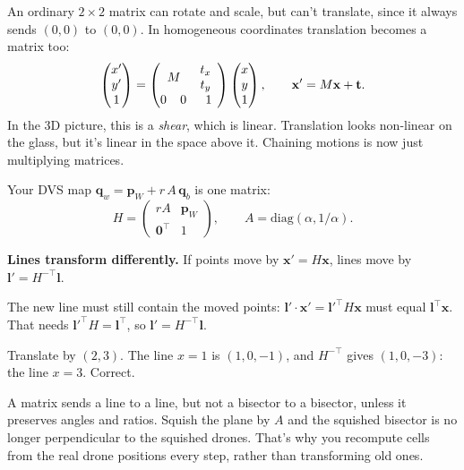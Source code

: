 \documentclass[11pt,a4paper]{article}
\newcommand{\vect}[1]{\mathbf{#1}}
\newcommand{\T}{^{\top}}
\newcommand{\vl}{\vect{l}}
\begin{document}
An ordinary $2\times2$ matrix can rotate and scale, but can't translate, since it always sends $(0,0)$ to $(0,0)$. In
homogeneous coordinates translation becomes a matrix too:
\[
\begin{pmatrix}x'\\y'\\1\end{pmatrix}=
\begin{pmatrix}\multicolumn{2}{c}{\;\;M\;\;}&\begin{matrix}t_x\\t_y\end{matrix}\\[2pt]0&0&1\end{pmatrix}
\begin{pmatrix}x\\y\\1\end{pmatrix},
\qquad \vect{x}'=M\vect{x}+\vect{t}.
\]
In the 3D picture, this is a \emph{shear}, which is linear. Translation looks non-linear on the glass, but it's linear
in the space above it. Chaining motions is now just multiplying matrices.

\begin{oursbox}
Your DVS map $\vect{q}_w=\vect{p}_W+r\,A\,\vect{q}_b$ is one matrix:
\[
H=\begin{pmatrix}rA&\vect{p}_W\\ \vect{0}\T&1\end{pmatrix},\qquad A=\mathrm{diag}(\alpha,1/\alpha).
\]
\end{oursbox}

\textbf{Lines transform differently.} If points move by $\vect{x}'=H\vect{x}$, lines move by $\vl'=H^{-\top}\vl$.
\begin{whybox}
The new line must still contain the moved points: $\vl'\cdot\vect{x}'=\vl'^{\top}H\vect{x}$ must equal $\vl\T\vect{x}$. That needs
$\vl'^{\top}H=\vl\T$, so $\vl'=H^{-\top}\vl$.
\end{whybox}
\begin{examplebox}
Translate by $(2,3)$. The line $x=1$ is $(1,0,-1)$, and $H^{-\top}$ gives $(1,0,-3)$: the line $x=3$. Correct.
\end{examplebox}

\begin{watchbox}
A matrix sends a line to a line, but not a bisector to a bisector, unless it preserves angles and ratios. Squish the plane by
$A$ and the squished bisector is no longer perpendicular to the squished drones. That's why you recompute cells from the real
drone positions every step, rather than transforming old ones.
\end{watchbox}
\end{document}
